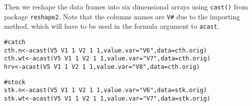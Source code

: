\documentclass[a4paper,english,10pt]{article}\usepackage[]{graphicx}\usepackage[]{color}
\makeatletter
\newcommand{\hlnum}[1]{\textcolor[rgb]{0.2,0.2,0.2}{#1}}%
\newcommand{\hlstr}[1]{\textcolor[rgb]{0.2,0.2,0.2}{#1}}%
\newcommand{\hlcom}[1]{\textcolor[rgb]{0.2,0.267,0.4}{#1}}%
\newcommand{\hlopt}[1]{\textcolor[rgb]{0.2,0.2,0.2}{#1}}%
\newcommand{\hlstd}[1]{\textcolor[rgb]{0,0,0}{#1}}%
\newcommand{\hlkwb}[1]{\textcolor[rgb]{0.361,0.506,0.596}{#1}}%
\newcommand{\hlkwc}[1]{\textcolor[rgb]{0.361,0.506,0.596}{#1}}%
\newcommand{\hlkwd}[1]{\textcolor[rgb]{0.361,0.506,0.596}{#1}}%
\newenvironment{kframe}{%
 \def\at@end@of@kframe{}%
 \ifinner\ifhmode%
  \def\at@end@of@kframe{\end{minipage}}%
  \begin{minipage}{\columnwidth}%
 \fi\fi%
 \def\FrameCommand##1{\hskip\@totalleftmargin \hskip-\fboxsep
 \colorbox{shadecolor}{##1}\hskip-\fboxsep
     \hskip-\linewidth \hskip-\@totalleftmargin \hskip\columnwidth}%
 \MakeFramed {\advance\hsize-\width
   \@totalleftmargin\z@ \linewidth\hsize
   \@setminipage}}%
 {\par\unskip\endMakeFramed%
 \at@end@of@kframe}
\newenvironment{knitrout}{}{} %
\newcommand{\code}[1]{{\texttt{#1}}}
\newcommand{\pkg}[1]{{\texttt{#1}}}
\makeatother
\begin{document}
Then we reshape the data frames into six dimensional arrays using \code{cast()} from package \pkg{reshape2}. Note that the columns names are \code{V\#} due to the importing method, which will have to be used in the formula argument to \code{acast}.

\begin{knitrout}
\color{fgcolor}\begin{kframe}
\begin{alltt}
\hlcom{# catch}
\hlstd{cth.n} \hlkwb{<-} \hlkwd{acast}\hlstd{(V5}\hlopt{~}\hlstd{V1}\hlopt{~}\hlnum{1}\hlopt{~}\hlstd{V2}\hlopt{~}\hlnum{1}\hlopt{~}\hlnum{1}\hlstd{,} \hlkwc{value.var}\hlstd{=}\hlstr{"V6"}\hlstd{,} \hlkwc{data}\hlstd{=cth.orig)}
\hlstd{cth.wt} \hlkwb{<-} \hlkwd{acast}\hlstd{(V5}\hlopt{~}\hlstd{V1}\hlopt{~}\hlnum{1}\hlopt{~}\hlstd{V2}\hlopt{~}\hlnum{1}\hlopt{~}\hlnum{1}\hlstd{,} \hlkwc{value.var}\hlstd{=}\hlstr{"V7"}\hlstd{,} \hlkwc{data}\hlstd{=cth.orig)}
\hlstd{hrv} \hlkwb{<-} \hlkwd{acast}\hlstd{(V5}\hlopt{~}\hlstd{V1}\hlopt{~}\hlnum{1}\hlopt{~}\hlstd{V2}\hlopt{~}\hlnum{1}\hlopt{~}\hlnum{1}\hlstd{,} \hlkwc{value.var}\hlstd{=}\hlstr{"V8"}\hlstd{,} \hlkwc{data}\hlstd{=cth.orig)}

\hlcom{# stock}
\hlstd{stk.n} \hlkwb{<-} \hlkwd{acast}\hlstd{(V5}\hlopt{~}\hlstd{V1}\hlopt{~}\hlnum{1}\hlopt{~}\hlstd{V2}\hlopt{~}\hlnum{1}\hlopt{~}\hlnum{1}\hlstd{,} \hlkwc{value.var}\hlstd{=}\hlstr{"V6"}\hlstd{,} \hlkwc{data}\hlstd{=stk.orig)}
\hlstd{stk.wt} \hlkwb{<-} \hlkwd{acast}\hlstd{(V5}\hlopt{~}\hlstd{V1}\hlopt{~}\hlnum{1}\hlopt{~}\hlstd{V2}\hlopt{~}\hlnum{1}\hlopt{~}\hlnum{1}\hlstd{,} \hlkwc{value.var}\hlstd{=}\hlstr{"V7"}\hlstd{,} \hlkwc{data}\hlstd{=stk.orig)}


\end{alltt}
\end{kframe}
\end{knitrout}
\end{document}
